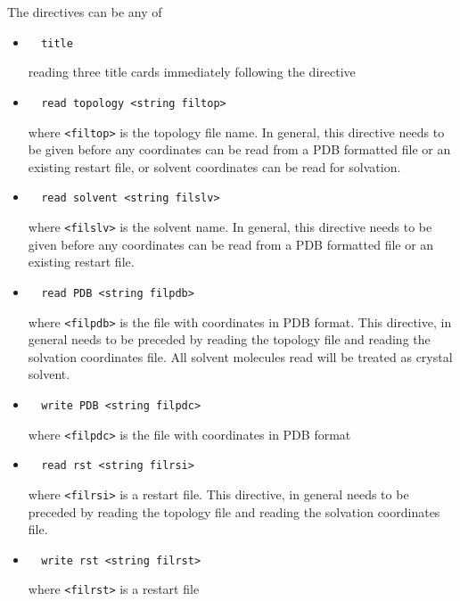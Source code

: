 The directives can be any of
\begin{itemize}

\item
\begin{verbatim}
  title
\end{verbatim}
reading three title cards immediately following the directive

\item
\begin{verbatim}
  read topology <string filtop>
\end{verbatim}
where \verb+<filtop>+ is the topology file name. In general, this
directive needs to be given before any coordinates can be read from a
PDB formatted file or an existing restart file, or solvent coordinates
can be read for solvation.

\item
\begin{verbatim}
  read solvent <string filslv>
\end{verbatim}
where \verb+<filslv>+ is the solvent name. In general, this directive
needs to be given before any coordinates can be read from a PDB
formatted file or an existing restart file.

\item
\begin{verbatim}
  read PDB <string filpdb>
\end{verbatim}
where \verb+<filpdb>+ is the file with coordinates in PDB format. This
directive, in general needs to be preceded by reading the topology
file and reading the solvation coordinates file. All solvent molecules
read will be treated as crystal solvent.

\item
\begin{verbatim}
  write PDB <string filpdc>
\end{verbatim}
where \verb+<filpdc>+ is the file with coordinates in PDB format

\item
\begin{verbatim}
  read rst <string filrsi>
\end{verbatim}
where \verb+<filrsi>+ is a restart file. This directive, in general needs
to be preceded by reading the topology file and reading the solvation
coordinates file.

\item
\begin{verbatim}
  write rst <string filrst>
\end{verbatim}
where \verb+<filrst>+ is a restart file


\end{itemize}
